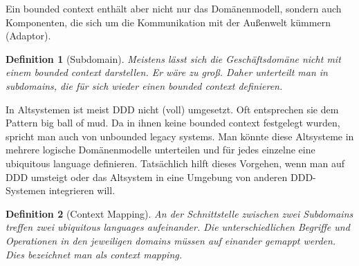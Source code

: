 \documentclass[11pt,a4paper]{scrartcl}
\newtheorem{Def}{Definition}[section]
\begin{document}
Ein bounded context enthält aber nicht nur das Domänenmodell, sondern auch Komponenten, die sich um die Kommunikation mit der Außenwelt kümmern (Adaptor).

\begin{Def}[Subdomain]
	Meistens lässt sich die Geschäftsdomäne nicht mit einem bounded context darstellen. Er wäre zu groß. Daher unterteilt man in subdomains, die für sich wieder einen bounded context definieren.
\end{Def}

In Altsystemen ist meist DDD nicht (voll) umgesetzt. Oft entsprechen sie dem Pattern big ball of mud. Da in ihnen keine bounded context festgelegt wurden, spricht man auch von unbounded legacy systems. Man könnte diese Altsysteme in mehrere logische Domänenmodelle unterteilen und für jedes einzelne eine ubiquitous language definieren. Tatsächlich hilft dieses Vorgehen, wenn man auf DDD umsteigt oder das Altsystem in eine Umgebung von anderen DDD-Systemen integrieren will.

\begin{Def}[Context Mapping]
	An der Schnittstelle zwischen zwei Subdomains treffen zwei ubiquitous languages aufeinander. Die unterschiedlichen Begriffe und Operationen in den jeweiligen domains müssen auf einander gemappt werden. Dies bezeichnet man als context mapping.
\end{Def}
\end{document}
